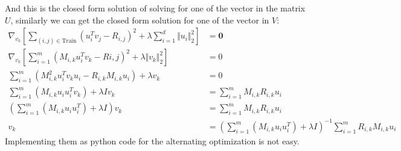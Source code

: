 \documentclass[]{article}
\begin{document}
        And this is the closed form solution of solving for one of the vector in the matrix $U$, similarly we can get the closed form solution for one of the vector in $V$:
        \begin{align*}\tag{B1.c.3}\label{eqn:B1.c.3}
            \nabla_{v_k} \left[
                \sum_{(i, j)\in \text{Train}}^{}
                    (u_i^Tv_j - R_{i, j})^2
                +
                \lambda \sum_{i = 1}^{d}
                    \Vert u_i\Vert_2^2
            \right] &= \mathbf{0}
            \\
            \nabla_{v_k} \left[
                \sum_{i = 1}^{m}(M_{i, k}u_i^Tv_k - R{i, j})^2 + \lambda \Vert v_k\Vert_2^2
            \right] &= 0
            \\
            \sum_{i = 1}^{m}
                (M_{i, k}^2u_i^Tv_ku_i - R_{i, k}M_{i, k}u_i) + \lambda v_k 
            &= 0
            \\
            \sum_{i = 1}^{m}(M_{i,k}u_iu_i^Tv_k) + \lambda I v_k
            &= \sum_{i = 1}^{m} M_{i, k}R_{i,k}u_i
            \\
            \left(
                \sum_{i = 1}^{m}(M_{i,k}u_iu_i^T) + \lambda I
            \right)v_k &= \sum_{i = 1}^{m} M_{i, k}R_{i,k}u_i
            \\
            v_k &= \left(
                \sum_{i = 1}^{m}(M_{i, k}u_iu_i^T) + \lambda I
            \right)^{-1}
            \sum_{i = 1}^{m} R_{i, k}M_{i, k}u_i
        \end{align*}
        Implementing them as python code for the alternating optimization is not easy. 
    
\end{document}
